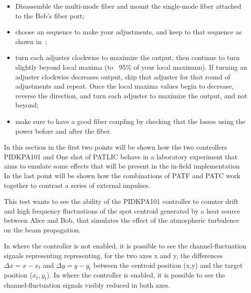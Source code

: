 \begin{itemize}
  \item Disassemble the multi-mode fiber and mount the single-mode fiber attached to the Bob's fiber port;
  \item choose an sequence to make your adjustments, and keep to that sequence as shown in~;
  \item turn each adjuster clockwise to maximize the output, then continue to turn slightly beyond local maxima (to ~95\% of your local maximum). If turning an adjuster clockwise decreases output, skip that adjuster for that round of adjustments and repeat. Once the local maxima values begin to decrease, reverse the direction, and turn each adjuster to maximize the output, and not beyond;
  \item make sure to have a good fiber coupling by checking that the losses using the power before and after the fiber.
\end{itemize}


In this section in the first two points will be shown how the two controllers PIDKPA101 and One shot of PATLIC behave in a laboratory experiment that aims to emulate some effects that will be present in the in-field implementation
In the last point will be shown how the combinations of PATF and PATC work together to contrast a series of external impulses.

This test wants to see the ability of the PIDKPA101 controller to counter drift and high frequency fluctuations of the spot centroid generated by a heat source between Alice and Bob, that simulates the effect of the atmospheric turbulence on
the beam propagation.

In  where the controller is not enabled, it is possible to see the channel-fluctuation signals representing representing, for the two axes x and y, the differences $\Delta x = x - x_t$ and $\Delta y = y - y_t$ between the centroid position (x,y) and the target position ($x_t, y_t$).
In  where the controller is enabled, it is possible to see the channel-fluctuation signals visibly reduced in both axes.

